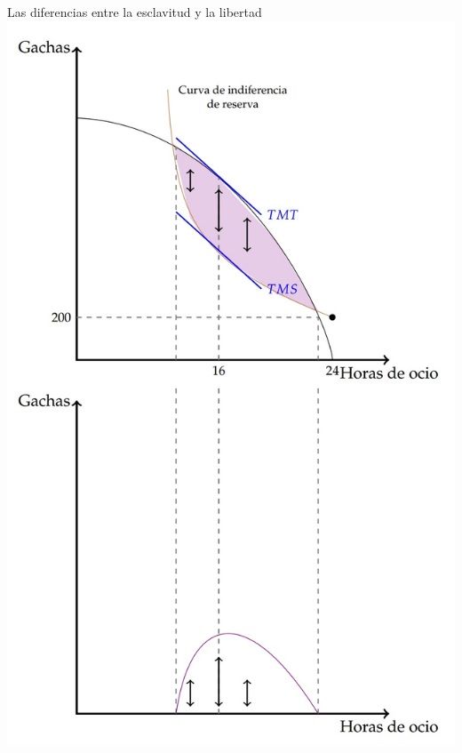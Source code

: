 \documentclass{beamer}
\begin{document}
\begin{frame}{Las diferencias entre la esclavitud y la libertad}
\centering
\includegraphics[scale=0.55]{../Figures/C19.13.jpg}
\end{frame}
\end{document}
